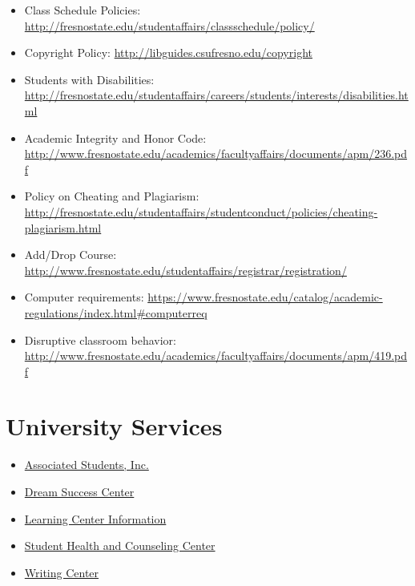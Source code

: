 \begin{itemize}
\tightlist
\item
  Class Schedule Policies:
  \url{http://fresnostate.edu/studentaffairs/classschedule/policy/}
\item
  Copyright Policy: \url{http://libguides.csufresno.edu/copyright}
\item
  Students with Disabilities:
  \url{http://fresnostate.edu/studentaffairs/careers/students/interests/disabilities.html}
\item
  Academic Integrity and Honor Code:
  \url{http://www.fresnostate.edu/academics/facultyaffairs/documents/apm/236.pdf}
\item
  Policy on Cheating and Plagiarism:
  \url{http://fresnostate.edu/studentaffairs/studentconduct/policies/cheating-plagiarism.html}
\item
  Add/Drop Course:
  \url{http://www.fresnostate.edu/studentaffairs/registrar/registration/}
\item
  Computer requirements:
  \url{https://www.fresnostate.edu/catalog/academic-regulations/index.html\#computerreq}
\item
  Disruptive classroom behavior:
  \url{http://www.fresnostate.edu/academics/facultyaffairs/documents/apm/419.pdf}
\end{itemize}

\hypertarget{sec:university-services}{%
\section{University Services}\label{sec:university-services}}

\begin{itemize}
\tightlist
\item
  \href{http://fresnostateasi.org/}{Associated Students, Inc.}
\item
  \href{http://fresnostate.edu/studentaffairs/dsc/index.html}{Dream
  Success Center}
\item
  \href{http://fresnostate.edu/studentaffairs/lrc}{Learning Center
  Information}
\item
  \href{https://www.fresnostate.edu/studentaffairs/health/}{Student
  Health and Counseling Center}
\item
  \href{http://www.fresnostate.edu/artshum/writingcenter/}{Writing
  Center}
\end{itemize}
